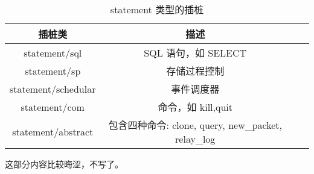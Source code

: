 \begin{table}[H]
    \centering
    \caption{statement 类型的插桩}
    \label{table:statement 类型的插桩}
    \setlength{\tabcolsep}{4mm}
    \begin{tabular}{c|ccc}
        \toprule
        \textbf{插桩类} & \textbf{描述} \\
        \midrule
        statement/sql & SQL 语句，如 SELECT \\
        statement/sp & 存储过程控制 \\
        statement/schedular & 事件调度器 \\
        statement/com & 命令，如 kill,quit \\
        statement/abstract & 包含四种命令: clone, query, new\_packet, relay\_log \\
        \bottomrule
    \end{tabular}
\end{table}

这部分内容比较晦涩，不写了。

\newpage